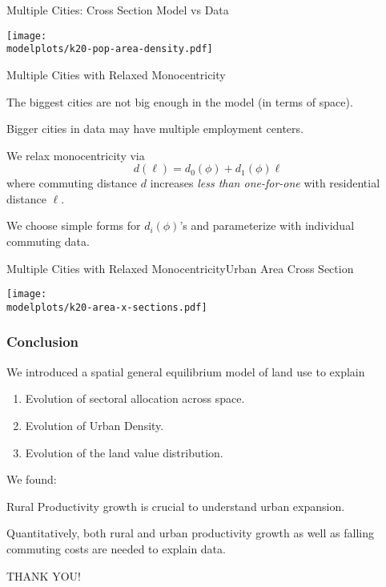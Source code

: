\documentclass[aspectratio=169]{beamer}
\begin{document}
\begin{frame}{Multiple Cities: Cross Section Model vs Data}
	\begin{adjustbox}{center}
		\texttt{[image: \\modelplots/k20-pop-area-density.pdf]}
	\end{adjustbox}
\end{frame}

\begin{frame}{Multiple Cities with Relaxed Monocentricity}

	\begin{midi}
		\item The biggest cities are not big enough in the model (in terms of space).
		\item Bigger cities in data may have multiple employment centers.
		\item We relax monocentricity via 
		\begin{equation*}
			d(\ell) = d_0(\phi) + d_1(\phi) \ell
		\end{equation*}
		where commuting distance $d$ increases \emph{less than one-for-one} with residential distance $\ell$.
		\item We choose simple forms for $d_i(\phi)$'s and parameterize with individual commuting data.
	\end{midi}
	
\end{frame}

\begin{frame}{Multiple Cities with Relaxed Monocentricity}{Urban Area Cross Section}
	\begin{adjustbox}{center}
		\texttt{[image: \\modelplots/k20-area-x-sections.pdf]}
	\end{adjustbox}
\end{frame}

\begin{frame}
\frametitle{Conclusion}

We introduced a spatial general equilibrium model of land use to explain

\begin{enumerate}
	\item Evolution of sectoral allocation across space.
	\item Evolution of Urban Density.
	\item Evolution of the land value distribution.
\end{enumerate}

\bigskip
We found: 

\begin{midi}
	\item Rural Productivity growth is crucial to understand urban expansion.
	\item Quantitatively, both rural and urban productivity growth as well as falling commuting costs are needed to explain data.
\end{midi}


\begin{center}
  THANK YOU!
\end{center}
\end{frame}
\end{document}
